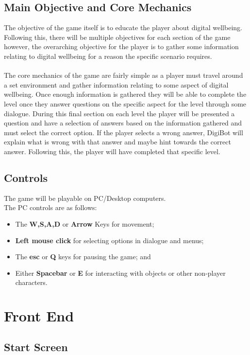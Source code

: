 \documentclass[a4paper]{scrreprt}
\begin{document}
\section{Main Objective and Core Mechanics}
The objective of the game itself is to educate the player about digital wellbeing. Following this, there will be multiple objectives for each section of the game however, the overarching objective for the player is to gather some information relating to digital wellbeing for a reason the specific scenario requires.
\\\\
The core mechanics of the game are fairly simple as a player must travel around a set environment and gather information relating to some aspect of digital wellbeing. Once enough information is gathered they will be able to complete the level once they answer questions on the specific aspect for the level through some dialogue. During this final section on each level the player will be presented a question and have a selection of answers based on the information gathered and must select the correct option. If the player selects a wrong answer, DigiBot will explain what is wrong with that answer and maybe hint towards the correct answer. Following this, the player will have completed that specific level.

\section{Controls}
The game will be playable on PC/Desktop computers.
\\ 
The PC controls are as follows:
\begin{itemize}
\item The \textbf{W,S,A,D} or \textbf{Arrow} Keys for movement;
\item \textbf{Left mouse click} for selecting options in dialogue and menus; 
\item The \textbf{esc} or \textbf{Q} keys for pausing the game; and
\item Either \textbf{Spacebar} or \textbf{E} for interacting with objects or other non-player characters.
\end{itemize}


\chapter{Front End}


\section{Start Screen}
\end{document}
